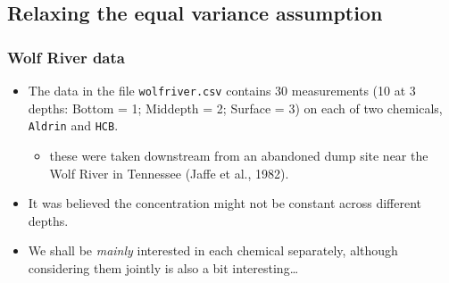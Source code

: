 \documentclass[a4paper]{article}
\begin{document}
\subsection{Relaxing the equal variance assumption}
\subsubsection{Wolf River data}
\begin{itemize}
	\item The data in the file \lstinline|wolfriver.csv| contains 30 measurements (10 at 3 depths: Bottom = 1; Middepth = 2; Surface = 3) on each of two chemicals, \lstinline|Aldrin| and \lstinline|HCB|.
	\begin{itemize}
		\item these were taken downstream from an abandoned dump site near the Wolf River in Tennessee (Jaffe et al., 1982).
	\end{itemize}
	\item It was believed the concentration might not be constant across different depths.
	\item We shall be \textit{mainly} interested in each chemical separately, although considering them jointly is also a bit interesting\dots
\end{itemize}
\end{document}
